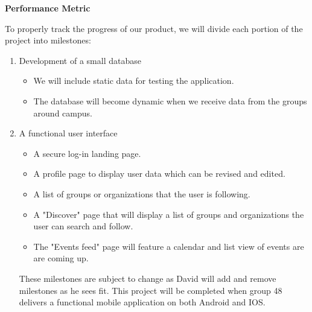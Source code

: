 \documentclass[10pt,letterpaper]{article}
\begin{document}
\begin{center}
\large
\textbf{Performance Metric}
\end{center}

To properly track the progress of our product, we will divide each portion of the project into milestones:

\begin{enumerate}
   \item Development of a small database
   \begin{itemize}
     \item We will include static data for testing the application.
     \item The database will become dynamic when we receive data from the groups around campus.
   \end{itemize}
   \item A functional user interface
   	\begin{itemize}
    	\item A secure log-in landing page.
        \item A profile page to display user data which can be revised and edited.
        \item A list of groups or organizations that the user is following.
        \item A "Discover" page that will display a list of groups and organizations the user can search and follow.
        \item The "Events feed" page will feature a calendar and list view of events are are coming up.
   \end{itemize}
   
These milestones are subject to change as David will add and remove milestones as he sees fit. This project will be completed when group 48 delivers a functional mobile application on both Android and IOS. 
\end{enumerate}
\end{document}
